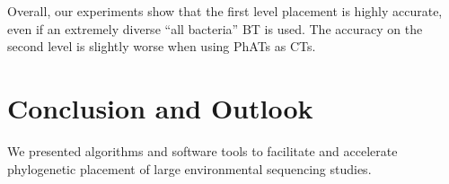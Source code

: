 
Overall, our experiments show that the first level placement is highly accurate,
even if an extremely diverse ``all bacteria'' \acl{BT} is used.
The accuracy on the second level is slightly worse when using \acp{PhAT} as \acp{CT}.



\section{Conclusion and Outlook}
\label{ch:AutomaticTrees:sec:ConclusionOutlook}

We presented algorithms and software tools to facilitate and accelerate
phylogenetic placement of large environmental sequencing studies. %

